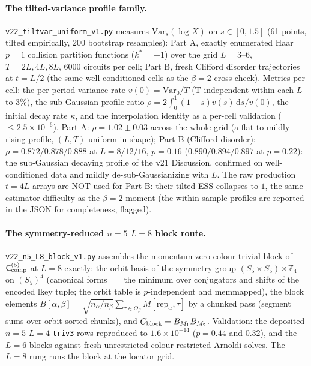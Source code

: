 \documentclass[aps,prx,reprint,superscriptaddress,nobibnotes,longbibliography]{revtex4-2}
\newcommand{\Ccomp}{\mathsf C_{\rm comp}}
\begin{document}
\paragraph{The tilted-variance profile family.}
\texttt{v22\_tiltvar\_uniform\_v1.py} measures
$\mathrm{Var}_s(\log X)$ on $s\in[0,1.5]$ (61 points, tilted empirically, 200
bootstrap resamples): Part A, exactly enumerated Haar $p=1$ collision
partition functions ($k^\ast=-1$) over the grid $L=3$--$6$,
$T=2L,4L,8L$, $6000$ circuits per cell; Part B, fresh Clifford disorder
trajectories at $t=L/2$ (the same well-conditioned cells as the
$\beta=2$ cross-check).  Metrics per cell: the per-period variance rate
$v(0)=\mathrm{Var}_0/T$ (T-independent within each $L$ to $3\%$), the
sub-Gaussian profile ratio $\rho=2\int_0^1(1-s)v(s)\,\mathrm
ds/v(0)$, the initial decay rate $\kappa$, and the interpolation identity
as a per-cell validation ($\le2.5\times10^{-6}$).  Part A:
$\rho=1.02\pm0.03$ across the whole grid (a flat-to-mildly-rising
profile, $(L,T)$-uniform in shape); Part B (Clifford disorder):
$\rho=0.872/0.878/0.888$ at $L=8/12/16$, $p=0.16$ ($0.890/0.894/0.897$
at $p=0.22$): the sub-Gaussian decaying profile of the v21 Discussion,
confirmed on well-conditioned data and mildly de-sub-Gaussianizing with
$L$.  The raw production $t=4L$ arrays are NOT used for
Part B: their tilted ESS collapses to $1$, the same estimator difficulty
as the $\beta=2$ moment (the within-sample profiles are reported in the
JSON for completeness, flagged).

\paragraph{The symmetry-reduced $n=5$ $L=8$ block route.}
\texttt{v22\_n5\_L8\_block\_v1.py} assembles the momentum-zero
colour-trivial block of $\Ccomp^{(5)}$ at $L=8$ exactly: the orbit basis
of the symmetry group $(S_5\times S_5)\rtimes\mathbb Z_4$ on
$(S_5)^4$ (canonical forms $=$ the minimum over conjugators and shifts of
the encoded lkey tuple; the orbit table is $p$-independent and
memmapped), the block elements
$B[\alpha,\beta]=\sqrt{n_\alpha/n_\beta}\sum_{\tau\in O_\beta}
M[\mathrm{rep}_\alpha,\tau]$ by a chunked pass (segment sums over
orbit-sorted chunks), and $C_{\rm block}=B_{M_1}B_{M_2}$.  Validation:
the deposited $n=5$ $L=4$ \texttt{triv3} rows reproduced to
$1.6\times10^{-14}$ ($p=0.44$ and $0.32$), and the $L=6$ blocks against
fresh unrestricted colour-restricted Arnoldi solves.  The $L=8$ rung
runs the block at the locator grid.
\end{document}
